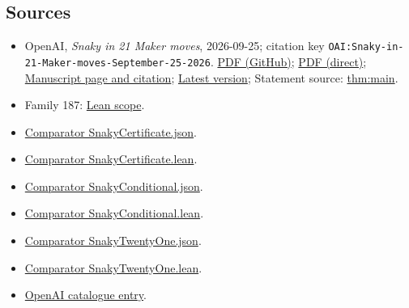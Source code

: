 \documentclass[11pt]{article}
\begin{document}
\subsection{Sources}
\begin{itemize}
\item OpenAI, \emph{Snaky in 21 Maker moves}, 2026-09-25; citation key \texttt{OAI:Snaky-in-21-Maker-moves-September-25-2026}. \href{https://github.com/openai/math/blob/adc7f1241b42e322a6451854ab7e4b4c146bf78a/preprints/Snaky-in-21-Maker-moves-September-25-2026/article.pdf}{PDF (GitHub)}; \href{https://github.com/openai/math/raw/adc7f1241b42e322a6451854ab7e4b4c146bf78a/preprints/Snaky-in-21-Maker-moves-September-25-2026/article.pdf}{PDF (direct)}; \href{https://github.com/openai/math/blob/adc7f1241b42e322a6451854ab7e4b4c146bf78a/preprints/Snaky-in-21-Maker-moves-September-25-2026/README.md}{Manuscript page and citation}; \href{https://github.com/openai/math/blob/main/preprints/Snaky-in-21-Maker-moves-September-25-2026/article.pdf}{Latest version}; Statement source: \href{https://github.com/openai/math/blob/adc7f1241b42e322a6451854ab7e4b4c146bf78a/preprints/Snaky-in-21-Maker-moves-September-25-2026/build/introduction.tex\#L25}{thm:main}.
\item Family 187: \href{https://github.com/openai/math/blob/adc7f1241b42e322a6451854ab7e4b4c146bf78a/lean/docs/187.md}{Lean scope}.
\item \href{https://github.com/openai/math/blob/adc7f1241b42e322a6451854ab7e4b4c146bf78a/lean/ComparatorChallenges/SnakyCertificate.json}{Comparator SnakyCertificate.json}.
\item \href{https://github.com/openai/math/blob/adc7f1241b42e322a6451854ab7e4b4c146bf78a/lean/ComparatorChallenges/SnakyCertificate.lean}{Comparator SnakyCertificate.lean}.
\item \href{https://github.com/openai/math/blob/adc7f1241b42e322a6451854ab7e4b4c146bf78a/lean/ComparatorChallenges/SnakyConditional.json}{Comparator SnakyConditional.json}.
\item \href{https://github.com/openai/math/blob/adc7f1241b42e322a6451854ab7e4b4c146bf78a/lean/ComparatorChallenges/SnakyConditional.lean}{Comparator SnakyConditional.lean}.
\item \href{https://github.com/openai/math/blob/adc7f1241b42e322a6451854ab7e4b4c146bf78a/lean/ComparatorChallenges/SnakyTwentyOne.json}{Comparator SnakyTwentyOne.json}.
\item \href{https://github.com/openai/math/blob/adc7f1241b42e322a6451854ab7e4b4c146bf78a/lean/ComparatorChallenges/SnakyTwentyOne.lean}{Comparator SnakyTwentyOne.lean}.
\item \href{https://github.com/openai/math/blob/adc7f1241b42e322a6451854ab7e4b4c146bf78a/CONTENTS.md}{OpenAI catalogue entry}.
\end{itemize}
\end{document}
